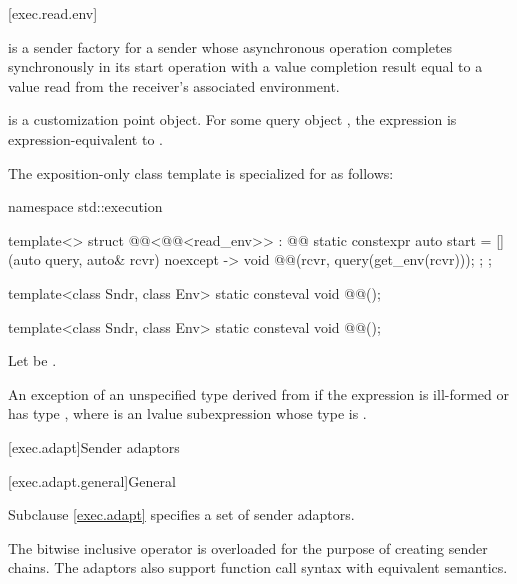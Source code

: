 [exec.read.env]{}

\pnum
{} is a sender factory for a sender
whose asynchronous operation completes synchronously in its start operation
with a value completion result equal to
a value read from the receiver's associated environment.

\pnum
{} is a customization point object.
For some query object ,
the expression  is expression-equivalent to
.

\pnum
The exposition-only class template 
is specialized for  as follows:
\begin{codeblock}
namespace std::execution {
  template<>
  struct @@<@@<read_env>> : @@ {
    static constexpr auto start =
      [](auto query, auto& rcvr) noexcept -> void {
        @@(rcvr, query(get_env(rcvr)));
      };
  };

  template<class Sndr, class Env>
    static consteval void @@();
}
\end{codeblock}

\begin{itemdecl}
template<class Sndr, class Env>
  static consteval void @@();
\end{itemdecl}

\begin{itemdescr}
\pnum
Let  be .

\pnum
\throws
An exception of an unspecified type derived from  if
the expression  is ill-formed or has type , where
 is an lvalue subexpression whose type is .
\end{itemdescr}

[exec.adapt]{Sender adaptors}

[exec.adapt.general]{General}

\pnum
Subclause \ref{exec.adapt} specifies a set of sender adaptors.

\pnum
The bitwise inclusive  operator is overloaded
for the purpose of creating sender chains.
The adaptors also support function call syntax with equivalent semantics.

